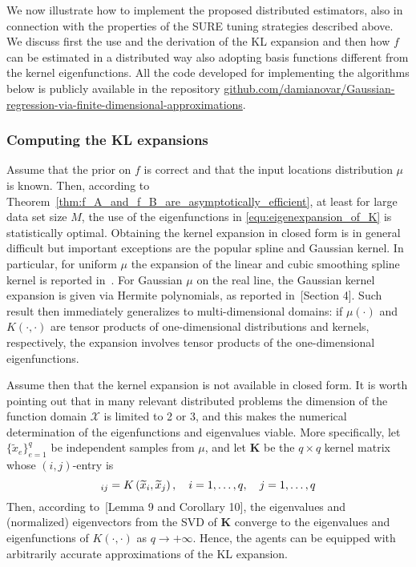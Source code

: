 \documentclass[10pt,twocolumn,twoside]{IEEEtran}					%
\theoremstyle	{plain}
\newcommand	{\Theorem}				[0]	{Theorem}
\begin{document}
We now illustrate how to implement the proposed distributed estimators, also in connection with the properties of the \ac{SURE} tuning strategies described above. We discuss first the use and the derivation of the \ac{KL} expansion and then how $f$ can be estimated in a distributed way also adopting basis functions different from the kernel eigenfunctions. All the code developed for implementing the algorithms below is publicly available in the repository \url{github.com/damianovar/Gaussian-regression-via-finite-dimensional-approximations}.

\subsubsection{Computing the \ac{KL} expansions}
\label{ssec:explicit_kl_expansions}

Assume that the prior on $f$ is correct and that the input locations distribution $\mu$ is known. Then, according to \Theorem~\ref{thm:f_A_and_f_B_are_asymptotically_efficient}, at least for large data set size $M$, the use of the eigenfunctions in \eqref{equ:eigenexpansion_of_K} is statistically optimal. Obtaining the kernel expansion in closed form is in general difficult but important exceptions are the popular spline and Gaussian kernel. In particular, for uniform $\mu$ the expansion of the linear and cubic smoothing spline kernel is reported in~\cite{Bell2004}. For Gaussian $\mu$ on the real line, the Gaussian kernel expansion is given via Hermite polynomials, as reported in~\cite{zhu_et_al__1998__gaussian_regression_and_optimal_finite_dimensional_linear_models}[Section 4]. Such result then immediately generalizes to multi-dimensional domains: if $\mu(\cdot)$ and $K(\cdot, \cdot)$ are tensor products of one-dimensional distributions and kernels, respectively, the expansion involves tensor products of the one-dimensional eigenfunctions.

Assume then that the kernel expansion is not available in closed form. It is worth pointing out that in many relevant distributed problems the dimension of the function domain $\mathcal{X}$ is limited to 2 or 3, and this makes the numerical determination of the eigenfunctions and eigenvalues viable. More specifically, let $\{\widetilde{x}_{e}\}_{e=1}^q$ be independent samples from $\mu$, and let $\bm{K}$ be the $q \times q$ kernel matrix whose $(i,j)$-entry is \vspace{0.1cm} 
%
\begin{equation}
	[\bm{K}]_{ij}
	=
	K \left( \widetilde{x}_i, \widetilde{x}_j \right),
	\quad i=1,\ldots,q, \quad j=1,\ldots,q
	\vspace{0.1cm}
	\label{equ:KernelMatrix}
\end{equation}
%
Then, according to~\cite{de1999consistent}[Lemma 9 and Corollary 10], the eigenvalues and (normalized) eigenvectors from the \ac{SVD} of $\bm{K}$ converge to the eigenvalues and eigenfunctions of $K(\cdot, \cdot)$ as $q \rightarrow +\infty$. Hence, the agents can be equipped with arbitrarily accurate approximations of the \ac{KL} expansion.
\end{document}
